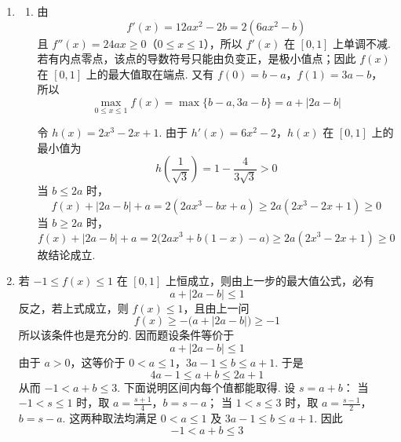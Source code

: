 \begin{solution}
\begin{enumerate}
\item
\begin{enumerate}
\item 由
\[
f'(x)=12ax^2-2b=2(6ax^2-b)
\]
且 \(f''(x)=24ax\geqslant0\)（\(0\leqslant x\leqslant1\)），所以 \(f'(x)\) 在 \([0,1]\) 上单调不减. 若有内点零点，该点的导数符号只能由负变正，是极小值点；因此 \(f(x)\) 在 \([0,1]\) 上的最大值取在端点.
又有
\(f(0)=b-a\)，\(f(1)=3a-b\)，
所以
\[
\max_{0\leqslant x\leqslant1}f(x)
=\max\{b-a,3a-b\}
=a+|2a-b|
\]

令 \(h(x)=2x^3-2x+1\). 由于
\(h'(x)=6x^2-2\)，\(h(x)\) 在 \([0,1]\) 上的最小值为
\[
h\left(\frac{1}{\sqrt{3}}\right)=1-\frac{4}{3\sqrt{3}}>0
\]
当 \(b\leqslant2a\) 时，
\[
f(x)+|2a-b|+a
=2(2ax^3-bx+a)
\geqslant2a(2x^3-2x+1)\geqslant0
\]
当 \(b\geqslant2a\) 时，
\[
f(x)+|2a-b|+a
=2\bigl(2ax^3+b(1-x)-a\bigr)
\geqslant2a(2x^3-2x+1)\geqslant0
\]
故结论成立.
\end{enumerate}

\item 若 \(-1\leqslant f(x)\leqslant1\) 在 \([0,1]\) 上恒成立，则由上一步的最大值公式，必有
\[
a+|2a-b|\leqslant1
\]
反之，若上式成立，则 \(f(x)\leqslant1\)，且由上一问
\[
f(x)\geqslant-\bigl(a+|2a-b|\bigr)\geqslant-1
\]
所以该条件也是充分的. 因而题设条件等价于
\[
a+|2a-b|\leqslant1
\]
由于 \(a>0\)，这等价于
\(0<a\leqslant1\)，\(3a-1\leqslant b\leqslant a+1\).
于是
\[
4a-1\leqslant a+b\leqslant2a+1
\]
从而 \(-1<a+b\leqslant3\). 下面说明区间内每个值都能取得. 设 \(s=a+b\)：
当 \(-1<s\leqslant1\) 时，取
\(a=\frac{s+1}{4}\)，\(b=s-a\)；
当 \(1<s\leqslant3\) 时，取
\(a=\frac{s-1}{2}\)，\(b=s-a\).
这两种取法均满足 \(0<a\leqslant1\) 及 \(3a-1\leqslant b\leqslant a+1\). 因此
\[
\boxed{-1<a+b\leqslant3}
\]
\end{enumerate}
\end{solution}
